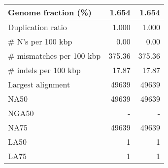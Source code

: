 \documentclass[12pt,a4paper]{article}
\begin{document}
\begin{table}[ht]
\begin{center}
\begin{tabular}{|l*{2}{|r}|}
Genome fraction (\%) & 1.654 & 1.654 \\ \hline
Duplication ratio & 1.000 & 1.000 \\ \hline
\# N's per 100 kbp & 0.00 & 0.00 \\ \hline
\# mismatches per 100 kbp & 375.36 & 375.36 \\ \hline
\# indels per 100 kbp & 17.87 & 17.87 \\ \hline
Largest alignment & 49639 & 49639 \\ \hline
NA50 & 49639 & 49639 \\ \hline
NGA50 & - & - \\ \hline
NA75 & 49639 & 49639 \\ \hline
LA50 & 1 & 1 \\ \hline
LA75 & 1 & 1 \\ \hline
\end{tabular}
\end{center}
\end{table}
\end{document}
